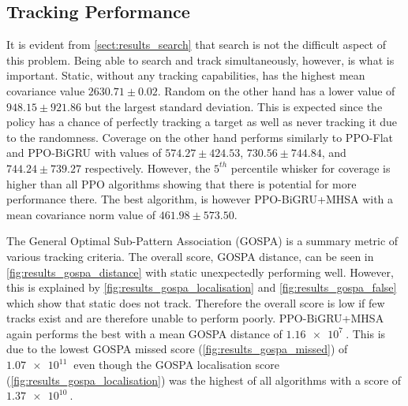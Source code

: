 
\subsection{Tracking Performance}
\label{sect:results_track}


It is evident from \autoref{sect:results_search} that search is not the difficult aspect of this problem. Being able to search and track simultaneously, however, is what is important. Static, without any tracking capabilities, has the highest mean covariance value $2630.71 \pm 0.02
$. Random on the other hand has a lower value of $948.15 \pm 921.86$ but the largest standard deviation. This is expected since the policy has a chance of perfectly tracking a target as well as never tracking it due to the randomness. Coverage on the other hand performs similarly to PPO-Flat and PPO-BiGRU with values of $574.27 \pm 424.53$, $730.56 \pm 744.84$, and $744.24 \pm 739.27$ respectively. However, the $5^{th}$ percentile whisker for coverage is higher than all PPO algorithms showing that there is potential for more performance there. The best algorithm, is however PPO-BiGRU+MHSA with a mean covariance norm value  of $461.98 \pm 573.50$. 

The General Optimal Sub-Pattern Association (GOSPA) \cite{Rahmathullah2017} is a summary metric of various tracking criteria. The overall score, GOSPA distance, can be seen in \autoref{fig:results_gospa_distance} with static unexpectedly performing well. However, this is explained by \autoref{fig:results_gospa_localisation} and \autoref{fig:results_gospa_false} which show that static does not track. Therefore the overall score is low if few tracks exist and are therefore unable to perform poorly. PPO-BiGRU+MHSA again performs the best with a mean GOSPA distance of $\SI{1.16e7}{}$.
This is due to the lowest GOSPA missed score (\autoref{fig:results_gospa_missed}) of $\SI{1.07e11}{}$
even though the GOSPA localisation score (\autoref{fig:results_gospa_localisation}) was the highest of all algorithms with a score of $\SI{1.37e10}{}$.

